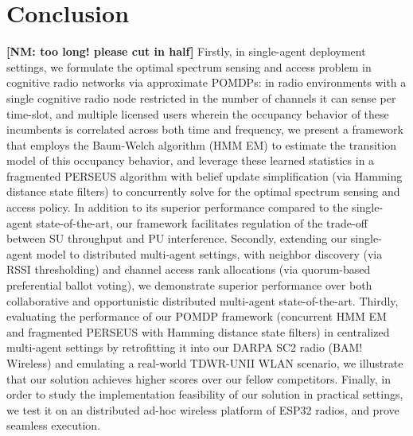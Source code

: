 \documentclass[12pt, draftcls, onecolumn]{IEEEtran}
\newcommand{\nm}[1]{{\color{blue}\bf{[NM: #1]}}}
\begin{document}
\section{Conclusion}\label{V}
\nm{too long! please cut in half}
Firstly, in single-agent deployment settings, we formulate the optimal spectrum sensing and access problem in cognitive radio networks via approximate POMDPs: in radio environments with a single cognitive radio node restricted in the number of channels it can sense per time-slot, and multiple licensed users wherein the occupancy behavior of these incumbents is correlated across both time and frequency, we present a framework that employs the Baum-Welch algorithm (HMM EM) to estimate the transition model of this occupancy behavior, and leverage these learned statistics in a fragmented PERSEUS algorithm with belief update simplification (via Hamming distance state filters) to concurrently solve for the optimal spectrum sensing and access policy. In addition to its superior performance compared to the single-agent state-of-the-art, our framework facilitates regulation of the trade-off between SU throughput and PU interference. Secondly, extending our single-agent model to distributed multi-agent settings, with neighbor discovery (via RSSI thresholding) and channel access rank allocations (via quorum-based preferential ballot voting), we demonstrate superior performance over both collaborative and opportunistic distributed multi-agent state-of-the-art. Thirdly, evaluating the performance of our POMDP framework (concurrent HMM EM and fragmented PERSEUS with Hamming distance state filters) in centralized multi-agent settings by retrofitting it into our DARPA SC2 radio (BAM! Wireless) and emulating a real-world TDWR-UNII WLAN scenario, we illustrate that our solution achieves higher scores over our fellow competitors. Finally, in order to study the implementation feasibility of our solution in practical settings, we test it on an distributed ad-hoc wireless platform of ESP32 radios, and prove seamless execution.


\end{document}
